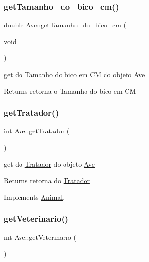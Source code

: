 \mbox{\label{class_ave_a2690c08b95642958601243104b50307b}} 
\subsubsection{\texorpdfstring{getTamanho\_do\_bico\_cm()}{getTamanho\_do\_bico\_cm()}}
{\footnotesize\ttfamily double Ave\+::get\+Tamanho\+\_\+do\+\_\+bico\+\_\+cm (\begin{DoxyParamCaption}\item[{void}]{ }\end{DoxyParamCaption})}



get do Tamanho do bico em CM do objeto \mbox{\hyperlink{class_ave}{Ave}} 

\begin{DoxyReturn}{Returns}
retorna o Tamanho do bico em CM 
\end{DoxyReturn}
\mbox{\label{class_ave_a5abfd5f54a32602a2cce892e3f5aa5ac}} 
\subsubsection{\texorpdfstring{getTratador()}{getTratador()}}
{\footnotesize\ttfamily int Ave\+::get\+Tratador (\begin{DoxyParamCaption}{ }\end{DoxyParamCaption})\hspace{0.3cm}{\ttfamily [virtual]}}



get do \mbox{\hyperlink{class_tratador}{Tratador}} do objeto \mbox{\hyperlink{class_ave}{Ave}} 

\begin{DoxyReturn}{Returns}
retorna do \mbox{\hyperlink{class_tratador}{Tratador}} 
\end{DoxyReturn}


Implements \mbox{\hyperlink{class_animal}{Animal}}.

\mbox{\label{class_ave_a9330b776620daca446414f388779d829}} 
\subsubsection{\texorpdfstring{getVeterinario()}{getVeterinario()}}
{\footnotesize\ttfamily int Ave\+::get\+Veterinario (\begin{DoxyParamCaption}{ }\end{DoxyParamCaption})\hspace{0.3cm}{\ttfamily [virtual]}}



